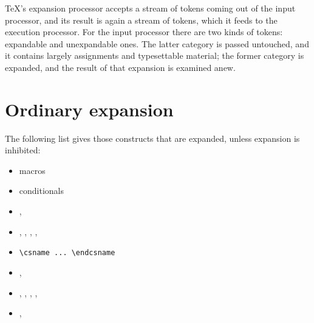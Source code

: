 \documentclass{book}
\begin{document}
\TeX's expansion processor accepts a stream of tokens
coming out of the input processor, and its result is
again a stream of tokens, which it feeds to the execution
processor. For the input processor there are two
kinds of tokens: expandable and unexpandable ones.
The latter category is passed untouched, and it contains
largely assignments and typesettable material;
the former category
is expanded, and the result of that expansion is examined anew.

\section{Ordinary expansion}

The following list gives those constructs
that are expanded, unless
expansion is inhibited:
\begin{itemize}
\item macros\label{expand:lijst}
\item conditionals
\item {}, 
\item {}, , , 
      , 
\item \verb,\csname ... \endcsname,
\item {}, 
\item {}, , , 
      , 
\item {}, 
\end{itemize}
\end{document}
